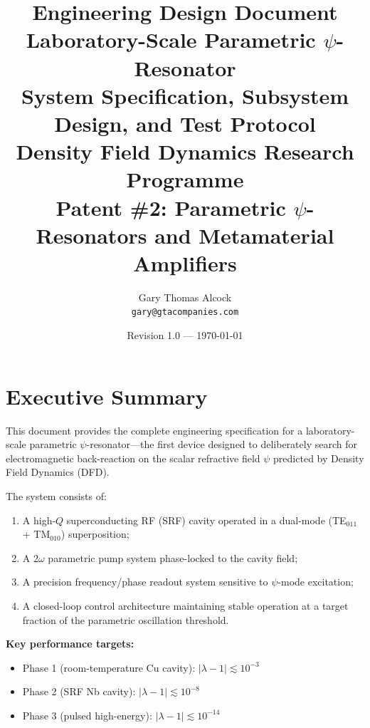 \documentclass[12pt,letterpaper]{article}
\title{\textbf{Engineering Design Document}\\[6pt]
  \Large Laboratory-Scale Parametric $\psi$-Resonator\\[6pt]
  \large System Specification, Subsystem Design, and Test Protocol\\[12pt]
  \normalsize Density Field Dynamics Research Programme\\
  Patent \#2: Parametric $\psi$-Resonators and Metamaterial Amplifiers}
\author{Gary Thomas Alcock\\
  \texttt{gary@gtacompanies.com}}
\date{Revision 1.0 --- \today}
\begin{document}
\maketitle
\thispagestyle{fancy}

\begin{center}
\end{center}

\vspace{12pt}
\tableofcontents
\newpage

\section{Executive Summary}

This document provides the complete engineering specification for a
laboratory-scale parametric $\psi$-resonator---the first device designed
to deliberately search for electromagnetic back-reaction on the scalar
refractive field $\psi$ predicted by Density Field Dynamics (DFD).

The system consists of:
\begin{enumerate}[noitemsep]
  \item A high-$Q$ superconducting RF (SRF) cavity operated in a
    dual-mode (TE$_{011}$ + TM$_{010}$) superposition;
  \item A $2\omega$ parametric pump system phase-locked to the cavity
    field;
  \item A precision frequency/phase readout system sensitive to
    $\psi$-mode excitation;
  \item A closed-loop control architecture maintaining stable operation
    at a target fraction of the parametric oscillation threshold.
\end{enumerate}

\textbf{Key performance targets:}
\begin{itemize}[noitemsep]
  \item Phase 1 (room-temperature Cu cavity): $|\lambda - 1| \lesssim 10^{-3}$
  \item Phase 2 (SRF Nb cavity): $|\lambda - 1| \lesssim 10^{-8}$
  \item Phase 3 (pulsed high-energy): $|\lambda - 1| \lesssim 10^{-14}$
\end{itemize}
\end{document}
